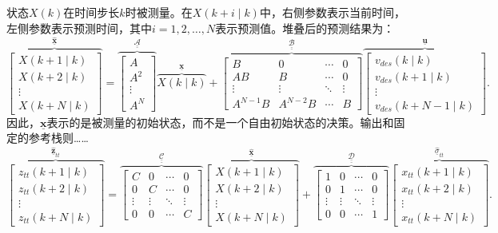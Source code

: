 \documentclass{article}
\newcommand{\uv}{\underline{\mathbf{u}}}
\newcommand{\xv}{\underline{\mathbf{x}}}
\newcommand{\xh}{\underline{\hat{\mathbf{x}}}}
\newcommand{\zh}{\underline{\hat{\mathbf{z}}}_{tt}}
\newcommand{\sh}{\underline{\hat{\sigma}}}
\newcommand{\Am}{\underline{\underline{\mathcal A}}}
\newcommand{\Bm}{\underline{\underline{\mathcal B}}}
\newcommand{\Cm}{\underline{\underline{\mathcal C}}}
\newcommand{\Dm}{\underline{\underline{\mathcal D}}}
\begin{document}
状态\(X(k)\)在时间步长\(k\)时被测量。在\(X(k+i\mid k)\)中，右侧参数表示当前时间，左侧参数表示预测时间，其中\(i=1,2,\ldots,N\)表示预测值。堆叠后的预测结果为：
\begin{equation}
\overbrace{\begin{bmatrix}
X(k+1\mid k)\\X(k+2\mid k)\\\vdots\\X(k+N\mid k)
\end{bmatrix}}^{\xh}
=
\overbrace{\begin{bmatrix}A\\A^2\\\vdots\\A^N\end{bmatrix}}^{\Am}
\overbrace{X(k\mid k)}^{\xv}
+
\overbrace{\begin{bmatrix}
B&0&\cdots&0\\
AB&B&\cdots&0\\
\vdots&\vdots&\ddots&\vdots\\
A^{N-1}B&A^{N-2}B&\cdots&B
\end{bmatrix}}^{\Bm}
\overbrace{\begin{bmatrix}
v_{des}(k\mid k)\\v_{des}(k+1\mid k)\\\vdots\\v_{des}(k+N-1\mid k)
\end{bmatrix}}^{\uv}.
\tag{25}
\end{equation}
因此，\(\xv\)表示的是被测量的初始状态，而不是一个自由初始状态的决策。输出和固定的参考栈则……
\begin{equation}
\overbrace{\begin{bmatrix}
z_{tt}(k+1\mid k)\\z_{tt}(k+2\mid k)\\\vdots\\z_{tt}(k+N\mid k)
\end{bmatrix}}^{\zh}
=
\overbrace{\begin{bmatrix}
C&0&\cdots&0\\0&C&\cdots&0\\\vdots&\vdots&\ddots&\vdots\\0&0&\cdots&C
\end{bmatrix}}^{\Cm}
\overbrace{\begin{bmatrix}
X(k+1\mid k)\\X(k+2\mid k)\\\vdots\\X(k+N\mid k)
\end{bmatrix}}^{\xh}
+
\overbrace{\begin{bmatrix}
1&0&\cdots&0\\0&1&\cdots&0\\\vdots&\vdots&\ddots&\vdots\\0&0&\cdots&1
\end{bmatrix}}^{\Dm}
\overbrace{\begin{bmatrix}
x_{tt}(k+1\mid k)\\x_{tt}(k+2\mid k)\\\vdots\\x_{tt}(k+N\mid k)
\end{bmatrix}}^{\sh_{tt}}.
\tag{26}
\end{equation}
\end{document}
